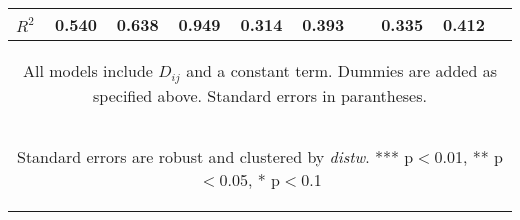 \begin{center}
\begin{tabular}{lccccccccc}
 $R^2$ & 0.540 & 0.638 & 0.949 & 0.314 & 0.393 &  & 0.335 & 0.412 &  \\ \hline
\multicolumn{10}{c}{\begin{footnotesize} All models include $ D_{ij}$ and a constant term. Dummies are added as specified above. Standard errors in parantheses.\end{footnotesize}} \\
\multicolumn{10}{c}{\begin{footnotesize} Standard errors are robust and clustered by \textit{distw}. *** p$<$0.01, ** p$<$0.05, * p$<$0.1\end{footnotesize}} \\
\end{tabular}
\end{center}
